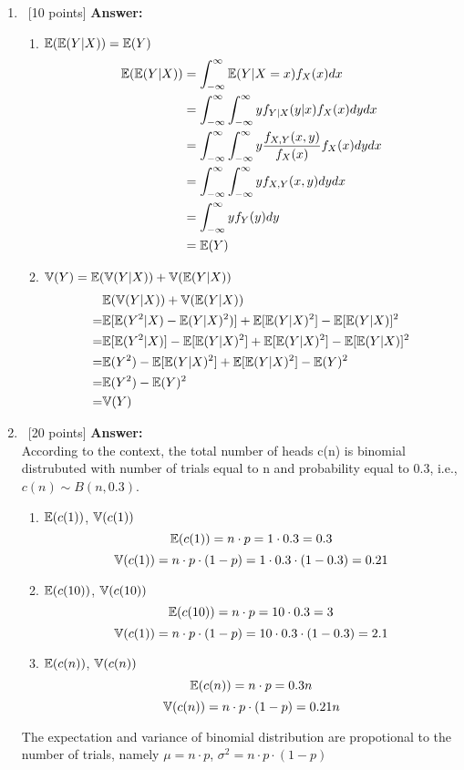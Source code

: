 \documentclass[12pt, fullpage,letterpaper]{article}
\begin{document}
\begin{enumerate}
\item~[10 points]
\textbf{Answer:}
\begin{enumerate}
\item $\mathbb{E}(\mathbb{E}(Y|X)) = \mathbb{E}(Y)$
\setcounter{equation}{0}
\begin{align}
\mathbb{E}(\mathbb{E}(Y|X)) &= \int_{-\infty}^\infty\mathbb{E}(Y|X=x)f_X(x)dx\\
&= \int_{-\infty}^\infty\int_{-\infty}^\infty yf_{Y|X}(y|x)f_X(x)dydx\\
&= \int_{-\infty}^\infty\int_{-\infty}^\infty y\frac{f_{X, Y}(x, y)}{f_X(x)}f_X(x)dydx\\
&= \int_{-\infty}^\infty\int_{-\infty}^\infty yf_{X, Y}(x, y)dydx\\
&= \int_{-\infty}^\infty yf_Y(y)dy\\
&= \mathbb{E}(Y)
\end{align}
\item $\mathbb{V}(Y) = \mathbb{E}(\mathbb{V}(Y|X)) + \mathbb{V}(\mathbb{E}(Y|X))$
\setcounter{equation}{0}
\begin{align}
&\mathbb{E}(\mathbb{V}(Y|X)) + \mathbb{V}(\mathbb{E}(Y|X))\\
=& \mathbb{E}[\mathbb{E}(Y^2|X) - \mathbb{E}(Y|X)^2)] + \mathbb{E}[\mathbb{E}(Y|X)^2] - \mathbb{E}[\mathbb{E}(Y|X)]^2\\
=& \mathbb{E}[\mathbb{E}(Y^2|X)] - \mathbb{E}[\mathbb{E}(Y|X)^2] + \mathbb{E}[\mathbb{E}(Y|X)^2] - \mathbb{E}[\mathbb{E}(Y|X)]^2\\
=& \mathbb{E}(Y^2) - \mathbb{E}[\mathbb{E}(Y|X)^2] + \mathbb{E}[\mathbb{E}(Y|X)^2] - \mathbb{E}(Y)^2\\
=& \mathbb{E}(Y^2) - \mathbb{E}(Y)^2\\
=& \mathbb{V}(Y)
\end{align}
\end{enumerate}

\item~[20 points]
\textbf{Answer:}\\
According to the context, the total number of heads c(n) is binomial distrubuted with number of trials equal to n and probability equal to 0.3, i.e., $c(n) \sim B(n, 0.3)$.
\begin{enumerate}
\item $\mathbb{E}(c(1))$, $\mathbb{V}(c(1))$
\[
\mathbb{E}(c(1)) = n \cdot p = 1 \cdot 0.3 = 0.3
\]
\[
\mathbb{V}(c(1)) = n \cdot p \cdot (1 - p) = 1 \cdot 0.3 \cdot (1 - 0.3) = 0.21
\]
\item $\mathbb{E}(c(10))$, $\mathbb{V}(c(10))$
\[
\mathbb{E}(c(10)) = n \cdot p = 10 \cdot 0.3 = 3
\]
\[
\mathbb{V}(c(1)) = n \cdot p \cdot (1 - p) = 10 \cdot 0.3 \cdot (1 - 0.3) = 2.1
\]
\item $\mathbb{E}(c(n))$, $\mathbb{V}(c(n))$
\[
\mathbb{E}(c(n)) = n \cdot p = 0.3n
\]
\[
\mathbb{V}(c(n)) = n \cdot p \cdot (1 - p) = 0.21n
\]
\end{enumerate} 
The expectation and variance of binomial distribution are propotional to the number of trials, namely $\mu = n \cdot p$, $\sigma^2 = n \cdot p \cdot (1-p)$


\end{enumerate}
\end{document}
